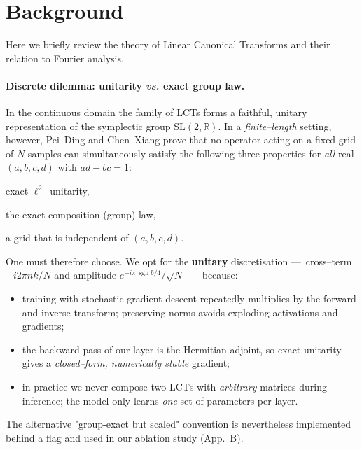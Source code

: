 \documentclass{article}
\newcommand{\LCT}{\textsc{LCT}}
\begin{document}
\section{Background}\label{sec:background}
Here we briefly review the theory of Linear Canonical Transforms and their relation to Fourier analysis.

\paragraph{Discrete dilemma: unitarity \emph{vs.} exact group law.}  In the
continuous domain the family of LCTs forms a faithful, unitary
representation of the symplectic group $\mathrm{SL}(2,\mathbb R)$.  In a
\emph{finite--length} setting, however, Pei--Ding\citep{pei1997} and
Chen--Xiang\citep{chen2009} prove that no operator acting on a fixed grid of
$N$ samples can simultaneously satisfy the following three properties for
\emph{all} real $(a,b,c,d)$ with $ad-bc=1$:
\begin{enumerate*}[label=\arabic*)]
  \item exact $\ell^2$--unitarity, \item the exact composition (group) law,
  \item a grid that is independent of $(a,b,c,d)$.
\end{enumerate*}
One must therefore choose.  We opt for the \textbf{unitary} discretisation
---~cross--term $-i2\pi nk/N$ and amplitude $e^{-i\pi\,\operatorname{sgn}b/4}/\sqrt{N}$~---
because:
\begin{itemize}
  \item training with stochastic gradient descent repeatedly multiplies by
        the forward and inverse transform; preserving norms avoids exploding
        activations and gradients;
  \item the backward pass of our layer is the Hermitian adjoint, so exact
        unitarity gives a \emph{closed--form, numerically stable} gradient;
  \item in practice we never compose two \LCT{}s with \emph{arbitrary} matrices
        during inference; the model only learns \emph{one} set of parameters
        per layer.
\end{itemize}
The alternative "group-exact but scaled" convention is nevertheless
implemented behind a flag and used in our ablation study (App.~B).
\end{document}
